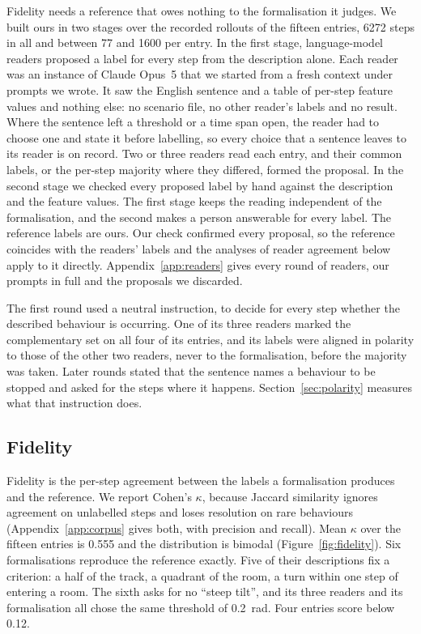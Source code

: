 \documentclass{article}
\begin{document}
Fidelity needs a reference that owes nothing to the formalisation it
judges. We built ours in two stages over the recorded rollouts of the
fifteen entries, 6272 steps in all and between 77 and 1600 per entry. In
the first stage, language-model readers proposed a label for every step
from the description alone. Each reader was an instance of Claude Opus~5
that we started from a fresh context under prompts we wrote. It saw the
English sentence and a table of per-step feature values and nothing
else: no scenario file, no other reader's labels and no result. Where the
sentence left a threshold or a time span open, the reader had to choose
one and state it before labelling, so every choice that a sentence leaves
to its reader is on record. Two or three readers read each entry, and
their common labels, or the per-step majority where they differed,
formed the proposal. In the second stage we checked every proposed label
by hand against the description and the feature values. The first stage
keeps the reading independent of the formalisation, and the second makes
a person answerable for every label. The reference labels are ours. Our
check confirmed every proposal, so the reference coincides with the
readers' labels and the analyses of reader agreement below apply to it
directly. Appendix~\ref{app:readers} gives every round of readers, our
prompts in full and the proposals we discarded.

The first round used a neutral instruction, to decide for every step
whether the described behaviour is occurring. One of its three readers
marked the complementary set on all four of its entries, and its labels
were aligned in polarity to those of the other two readers, never to the
formalisation, before the majority was taken. Later rounds stated that the
sentence names a behaviour to be stopped and asked for the steps where it
happens. Section~\ref{sec:polarity} measures what that instruction does.

\subsection{Fidelity}
\label{sec:fidelity}

Fidelity is the per-step agreement between the labels a formalisation
produces and the reference. We report Cohen's $\kappa$, because Jaccard
similarity ignores agreement on unlabelled steps and loses resolution on
rare behaviours (Appendix~\ref{app:corpus} gives both, with precision and
recall). Mean $\kappa$ over the fifteen entries is 0.555 and the
distribution is bimodal (Figure~\ref{fig:fidelity}). Six formalisations
reproduce the reference exactly. Five of their descriptions fix a
criterion: a half of the track, a quadrant of the room, a turn within one
step of entering a room. The sixth asks for no ``steep tilt'', and its
three readers and its formalisation all chose the same threshold of
0.2~rad. Four entries score below 0.12.
\end{document}
